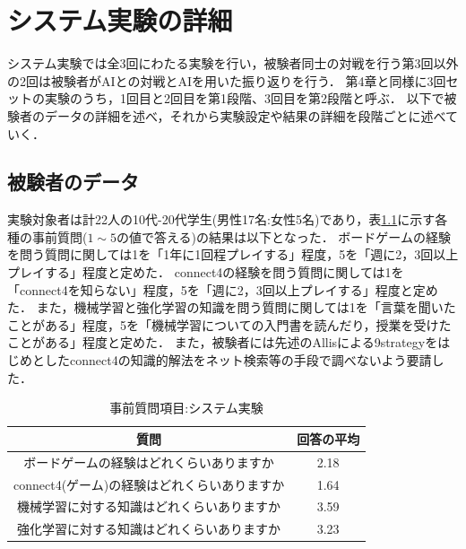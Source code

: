 \chapter{システム実験の詳細}
\label{chap:system}
システム実験では全3回にわたる実験を行い，被験者同士の対戦を行う第3回以外の2回は被験者がAIとの対戦とAIを用いた振り返りを行う．
第4章と同様に3回セットの実験のうち，1回目と2回目を第1段階、3回目を第2段階と呼ぶ．
以下で被験者のデータの詳細を述べ，それから実験設定や結果の詳細を段階ごとに述べていく．
\section{被験者のデータ}
実験対象者は計22人の10代-20代学生(男性17名:女性5名)であり，表\ref{table:before}に示す各種の事前質問($1\sim5$の値で答える)の結果は以下となった．
ボードゲームの経験を問う質問に関しては1を「1年に1回程プレイする」程度，5を「週に2，3回以上プレイする」程度と定めた．
connect4の経験を問う質問に関しては1を「connect4を知らない」程度，5を「週に2，3回以上プレイする」程度と定めた．
また，機械学習と強化学習の知識を問う質問に関しては1を「言葉を聞いたことがある」程度，5を「機械学習についての入門書を読んだり，授業を受けたことがある」程度と定めた．
また，被験者には先述のAllis\cite{allis}による9strategyをはじめとしたconnect4の知識的解法をネット検索等の手段で調べないよう要請した．
\begin{table}[H]
    \caption{事前質問項目:システム実験}
    \label{table:before}
	\small
    \begin{tabular}{c||c}
        \multicolumn{1}{c}{質問} & 回答の平均\\ \hline \hline
        ボードゲームの経験はどれくらいありますか & 2.18\\
        connect4(ゲーム)の経験はどれくらいありますか& 1.64\\\hline
        機械学習に対する知識はどれくらいありますか& 3.59\\
        強化学習に対する知識はどれくらいありますか& 3.23\\
    \end{tabular}
    
\end{table}
